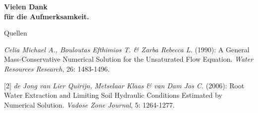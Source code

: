 \documentclass[xcolor=dvipsnames]{beamer}
\begin{document}
\begin{frame}[plain]
  \begin{center}
    \colorbox{boxes}{\parbox[c][2cm]{0.75\textwidth}
      {\begin{center}
          \textcolor{letters}{\textbf{\huge Vielen Dank \\ {\small für die Aufmerksamkeit.}}}
        \end{center}
      }
    }
  \end{center} 
  \vspace{1.0cm}
  \begin{block}{Quellen}
    \begin{tiny}
      [1] \textit{Celia Michael A., Bouloutas Efthimios T. \& Zarba Rebecca L.} (1990): A General Mass-Conservative Numerical Solution for the Unsaturated Flow Equation. \textit{Water Resources Research}, 26: 1483-1496.

      [2] \textit{de Jong van Lier Quirijn, Metselaar Klaas \& van Dam Jos C.} (2006): Root Water Extraction and Limiting Soil Hydraulic Conditions Estimated by Numerical Solution. \textit{Vadose Zone Journal}, 5: 1264-1277.
    \end{tiny}
  \end{block}
\end{frame}
\end{document}
